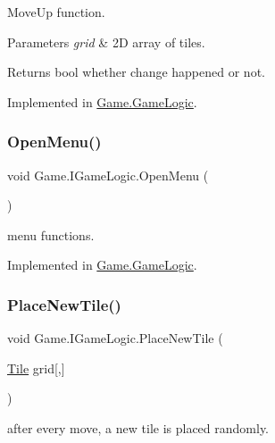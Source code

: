 Move\+Up function. 


\begin{DoxyParams}{Parameters}
{\em grid} & 2D array of tiles.\\
\hline
\end{DoxyParams}
\begin{DoxyReturn}{Returns}
bool whether change happened or not.
\end{DoxyReturn}


Implemented in \mbox{\hyperlink{class_game_1_1_game_logic_af397bfc00de61436b0ec1f5a837bc61c}{Game.\+Game\+Logic}}.

\mbox{\label{interface_game_1_1_i_game_logic_a87f5edc4698d50e56c64e3b822ed7ab7}} 
\subsubsection{\texorpdfstring{OpenMenu()}{OpenMenu()}}
{\footnotesize\ttfamily void Game.\+I\+Game\+Logic.\+Open\+Menu (\begin{DoxyParamCaption}{ }\end{DoxyParamCaption})}



menu functions. 



Implemented in \mbox{\hyperlink{class_game_1_1_game_logic_a9d04ec4a8a2cc27d098ae6169beb2cf9}{Game.\+Game\+Logic}}.

\mbox{\label{interface_game_1_1_i_game_logic_af4c46a6bc7485d51c95c3eaad66daddf}} 
\subsubsection{\texorpdfstring{PlaceNewTile()}{PlaceNewTile()}}
{\footnotesize\ttfamily void Game.\+I\+Game\+Logic.\+Place\+New\+Tile (\begin{DoxyParamCaption}\item[{\mbox{\hyperlink{class_game_1_1_tile}{Tile}}}]{grid\mbox{[},\mbox{]} }\end{DoxyParamCaption})}



after every move, a new tile is placed randomly. 



